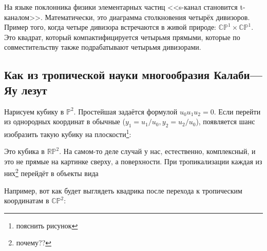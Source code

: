 \documentclass[11pt]{article}
\theoremstyle{remark}
\theoremstyle{definition}
\newcommand{\que}[1]{\footnote{\textcolor[rgb]{0.38,0.69,0.82}{#1}}}
\begin{document}
На языке поклонника физики элементарных частиц <<s-канал становится t-каналом>>. Математически, это диаграмма столкновения четырёх дивизоров. Пример того, когда четыре дивизора встречаются в живой природе: $\mathbb{CP}^1 \times \mathbb{CP}^1$. Это квадрат, который компактифицируется четырьмя прямыми, которые по совместительству также подрабатывают четырьмя дивизорами.

\subsection{Как из тропической науки многообразия Калаби---Яу лезут}

Нарисуем кубику в $\mathbb{P}^2$. Простейшая задаётся формулой $u_0 u_1 u_2 = 0$. Если перейти из однородных координат в обычные ($y_1 = u_1/u_0, y_2 = u_2/u_0$), появляется шанс изобразить такую кубику на плоскости\que{пояснить рисунок}:

\begin{center}
\end{center}

Это кубика в $\mathbb{RP}^2$. На самом-то деле случай у нас, естественно, комплексный, и это не прямые на картинке сверху, а поверхности. При тропикализации каждая из них\que{почему??} перейдёт в объекты вида

\begin{center}
\end{center}



Например, вот как будет выглядеть квадрика после перехода к тропическим координатам в $\mathbb{CP}^2$:

\begin{center}
\end{center}
\end{document}
